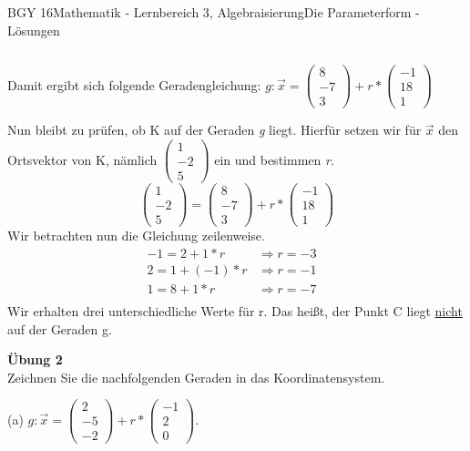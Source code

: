 \documentclass[oneside,openany,headings=optiontotoc,11pt,numbers=noenddot]{scrreprt}
\begin{document}
\begin{worksheet}{BGY 16}{Mathematik - Lernbereich 3, Algebraisierung}{Die Parameterform - Lösungen}
\begin{framed}
\begin{tabularx}{\textwidth}{XX}
			\end{tabularx}
			Damit ergibt sich folgende Geradengleichung: \(g: \vec{x} = \left(\begin{array}{c}8\\-7\\3\end{array}\right) + r*\left(\begin{array}{c}-1\\18\\1\end{array}\right)\)\\
			\par\noindent
			Nun bleibt zu prüfen, ob K auf der Geraden \textit{g} liegt. Hierfür setzen wir für \(\vec{x}\)	den Ortsvektor von K, nämlich \(\left(\begin{array}{c}1\\-2\\5\end{array}\right)\) ein und bestimmen \textit{r}.\\
			\[\left(\begin{array}{c}1\\-2\\5\end{array}\right) = \left(\begin{array}{c}8\\-7\\3\end{array}\right) + r*\left(\begin{array}{c}-1\\18\\1\end{array}\right)\]
			Wir betrachten nun die Gleichung zeilenweise.
			\[\begin{array}{llc}
			-1 = 2 + 1*r& \Rightarrow r = -3&\\
			2 = 1 + (-1)*r & \Rightarrow r = -1&\\
			1 = 8 + 1*r & \Rightarrow r = -7 &\\
			\end{array}\]
			Wir erhalten drei unterschiedliche Werte für r. Das heißt, der Punkt C liegt \underline{nicht} auf der Geraden g.
		\end{framed}
		\newpage
		\begin{framed}
			\noindent
			\tiny{\color{codegray}\textbf{Übung 2}\\Zeichnen Sie die nachfolgenden Geraden in das Koordinatensystem.
			\par\noindent
			(a) \(g: \vec{x} = \left(\begin{array}{c}2\\-5\\-2\end{array}\right) + r* \left(\begin{array}{c}-1\\2\\0\end{array}\right)\).}
			

\end{framed}
\end{worksheet}
\end{document}
